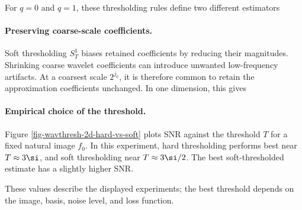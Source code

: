 For $q=0$ and $q=1$, these thresholding rules define two different estimators



  
\paragraph{Preserving coarse-scale coefficients.}

Soft thresholding $S_T^1$ biases retained coefficients by reducing their magnitudes.
Shrinking coarse wavelet coefficients can introduce unwanted low-frequency artifacts. At a coarsest scale $2^{j_0}$, it is therefore common to retain the approximation coefficients unchanged. In one dimension, this gives
                                                                                                 

                                       
                                                                                                                                                                               


  
\paragraph{Empirical choice of the threshold.}

Figure \ref{fig-wavthresh-2d-hard-vs-soft} plots SNR against the threshold $T$ for a fixed natural image $f_0$. In this experiment, hard thresholding performs best near $T \approx 3\si$, and soft thresholding near $T\approx 3\si/2$. The best soft-thresholded estimate has a slightly higher SNR.


These values describe the displayed experiments; the best threshold depends on the image, basis, noise level, and loss function.


